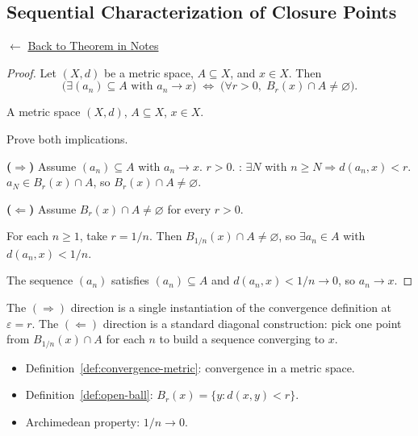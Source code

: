 
\subsection*{Sequential Characterization of Closure Points}
\label{prf:sequential-characterization-closure}

\begin{remark*}[Return]
$\leftarrow$ \hyperref[thm:sequential-char-closure]{Back to Theorem in Notes}
\end{remark*}

\begin{proof}
\Claim Let $(X,d)$ be a metric space, $A \subseteq X$, and $x \in X$.
Then
\[
\bigl(\exists (a_n) \subseteq A \text{ with } a_n \to x\bigr)
\;\Longleftrightarrow\;
\bigl(\forall r > 0,\; B_r(x) \cap A \neq \varnothing\bigr).
\]

\Given A metric space $(X,d)$, $A \subseteq X$, $x \in X$.

\Goal Prove both implications.

\medskip
\noindent\textbf{($\Rightarrow$)}
Assume $(a_n) \subseteq A$ with $a_n \to x$.
\Let $r > 0$.
: $\exists N$ with $n \ge N \Rightarrow d(a_n, x) < r$.
\Therefore $a_N \in B_r(x) \cap A$, so $B_r(x) \cap A \neq \varnothing$.

\medskip
\noindent\textbf{($\Leftarrow$)}
Assume $B_r(x) \cap A \neq \varnothing$ for every $r > 0$.

For each $n \ge 1$, take $r = 1/n$.
Then $B_{1/n}(x) \cap A \neq \varnothing$, so $\exists a_n \in A$ with $d(a_n, x) < 1/n$.

The sequence $(a_n)$ satisfies $(a_n) \subseteq A$ and $d(a_n, x) < 1/n \to 0$,
so $a_n \to x$.
\end{proof}

\begin{remark*}
The $(\Rightarrow)$ direction is a single instantiation of the convergence
definition at $\varepsilon = r$.
The $(\Leftarrow)$ direction is a standard diagonal construction: pick one point
from $B_{1/n}(x) \cap A$ for each $n$ to build a sequence converging to $x$.
\end{remark*}

\begin{remark*}[Dependencies]
\begin{itemize}
  \item Definition~\ref{def:convergence-metric}: convergence in a metric space.
  \item Definition~\ref{def:open-ball}: $B_r(x) = \{y : d(x,y) < r\}$.
  \item Archimedean property: $1/n \to 0$.
\end{itemize}
\end{remark*}
